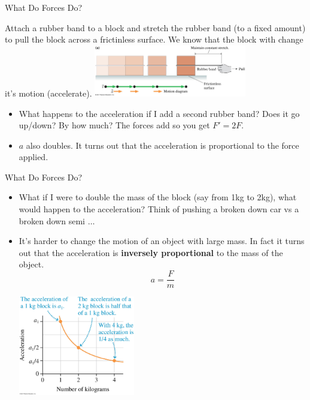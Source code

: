 \documentclass{beamer}
\begin{document}
\begin{frame}{What Do Forces Do?}
\begin{center}
   Attach a rubber band to a block and stretch the rubber band (to a fixed amount) to pull the block across a frictinless surface. We know that the block with change it's motion (accelerate).
   \includegraphics[width=0.5\textwidth]{../figures/05_15_FigureA.jpg}
\end{center}
\begin{itemize}
   \item<2-> What happens to the acceleration if I add a second rubber band? Does it go up/down? By how much? The forces add so you get $F'=2F$.
   \item<3-> $a$ also doubles. It turns out that the acceleration is proportional to the force applied.
\end{itemize}
\end{frame}

\begin{frame}{What Do Forces Do?}
\begin{itemize}
   \item What if I were to double the mass of the block (say from 1kg to 2kg), what would happen to the acceleration? Think of pushing a broken down car vs a broken down semi $\ldots$
   \item<2-> It's harder to change the motion of an object with large mass. In fact it turns out that the acceleration is {\bf inversely proportional} to the mass of the object.
   \begin{equation*}
      a=\frac{F}{m}
   \end{equation*}
   \begin{center}
      \includegraphics[width=0.4\textwidth]{../figures/05_16_Figure.jpg}
   \end{center}
\end{itemize}
\end{frame}
\end{document}
